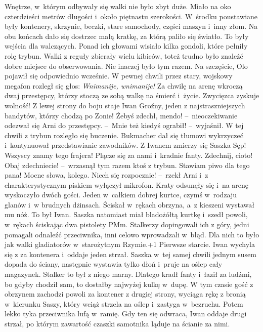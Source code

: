 \documentclass[../MAIN.tex]{subfiles}
\begin{document}
\pp
Wnętrze, w~którym odbywały się walki nie było zbyt duże. Miało na oko czterdzieści metrów długości i~około piętnastu szerokości. W~środku poustawiane były kontenery, skrzynie, beczki, stare samochody, części maszyn i~inny złom. Na obu końcach dało się dostrzec małą kratkę, za którą paliło się światło. To były wejścia dla walczących. Ponad ich głowami wisiało kilka gondoli, które pełniły rolę trybun. Walki z reguły zbierały wielu kibiców, toteż trudno było znaleźć dobre miejsce do obserwowania. Nie inaczej było tym razem. Na szczęście, Olo pojawił się odpowiednio wcześnie.
\pp
W pewnej chwili przez stary, wojskowy megafon rozległ się głos:
\sx \textit{Wnimanije, wnimanije!} Za chwilę na arenę wkroczą dwaj przestępcy, którzy stoczą ze sobą walkę na śmierć i~życie. Zwycięzca zyskuje wolność! Z lewej strony do boju staje Iwan Groźny, jeden z najstraszniejszych bandytów, którzy chodzą po Zonie! Żebyś zdechł, mendo! --~nieoczekiwanie odezwał się Arni do przestępcy. --~Mnie też kiedyś ograbił! --~wyjaśnił.
\qd
\hspace{10em}W tej chwili z trybun rozległo się buczenie. Bukmacher dał się tłumowi wykrzyczeć i~kontynuował przedstawianie zawodników.
\sx Z Iwanem zmierzy się Saszka Sęp! Wszyscy znamy tego frajera! Plącze się za nami i~kradnie fanty.
\xx Zdechnij, cioto! Obaj zdechniecie! --~wrzasnął tym razem ktoś z trybun.
\xx Stawiam piwo dla tego pana! Mocne słowa, kolego. Niech się rozpocznie! --~rzekł Arni i~z charakterystycznym piskiem wyłączył mikrofon.
\qd
\hspace{24em}Kraty odsunęły się i~na arenę wyskoczyło dwóch gości. Jeden w~całkiem dobrej kurtce, czymś w~rodzaju glanów i~w brudnych dżinsach. Ściskał w~rękach obrzyna, a~z kieszeni wystawał mu nóż. To był Iwan. Saszka natomiast miał bladożółtą kurtkę i~szedł powoli, w~rękach ściskając dwa pistolety PMm. Stalkerzy dopingowali ich z góry, jedni pomagali odnaleźć przeciwnika, inni celowo wprowadzali w~błąd. Dla nich to było jak walki gladiatorów w~starożytnym Rzymie.\looseness+1
\pp
Pierwsze starcie. Iwan wychyla się z za kontenera i~oddaje jeden strzał. Saszka w~tej samej chwili jednym susem dopada do ściany, następnie wystawia tylko dłoń i~pruje na oślep cały magazynek. Stalker to był z niego marny. Dlatego kradł fanty i~łaził za ludźmi, bo gdyby chodził sam, to dostałby najwyżej kulkę w~dupę.
\pp
W tym czasie gość z obrzynem zachodzi powoli za kontener z drugiej strony, wyciąga rękę z bronią w~kierunku Saszy, który wciąż strzela na oślep i~zastyga w~bezruchu. Potem lekko tyka przeciwnika lufą w~ramię. Gdy ten się odwraca, Iwan oddaje drugi strzał, po którym zawartość czaszki samotnika ląduje na ścianie za nimi.
\end{document}
